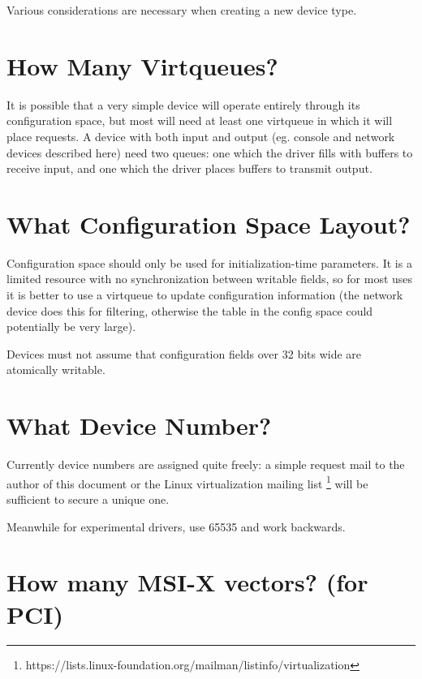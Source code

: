Various considerations are necessary when creating a new device
type.

\section{How Many Virtqueues?}\label{sec:Creating New Device Types / How Many Virtqueues?}

It is possible that a very simple device will operate entirely
through its configuration space, but most will need at least one
virtqueue in which it will place requests. A device with both
input and output (eg. console and network devices described here)
need two queues: one which the driver fills with buffers to
receive input, and one which the driver places buffers to
transmit output.

\section{What Configuration Space Layout?}\label{sec:Creating New Device Types / What Configuration Space Layout?}

Configuration space should only be used for initialization-time
parameters.  It is a limited resource with no synchronization between
writable fields, so for most uses it is better to use a virtqueue to update
configuration information (the network device does this for filtering,
otherwise the table in the config space could potentially be very
large).

Devices must not assume that configuration fields over 32 bits wide
are atomically writable.

\section{What Device Number?}\label{sec:Creating New Device Types / What Device Number?}

Currently device numbers are assigned quite freely: a simple
request mail to the author of this document or the Linux
virtualization mailing list
\footnote{https://lists.linux-foundation.org/mailman/listinfo/virtualization
} will be sufficient to secure a unique one.

Meanwhile for experimental drivers, use 65535 and work backwards.

\section{How many MSI-X vectors?  (for PCI)}\label{sec:Creating New Device Types / How many MSI-X vectors?  (for PCI)}

